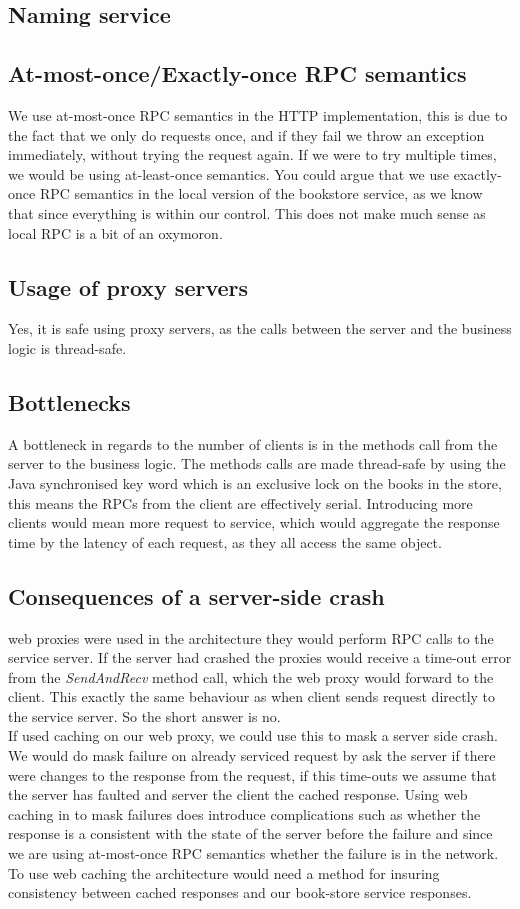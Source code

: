 \documentclass[a4paper]{article}
\begin{document}
\subsection{Naming service}

\subsection{At-most-once/Exactly-once RPC semantics}
We use at-most-once RPC semantics in the HTTP implementation, this is due to the fact that we only do requests once, and if they fail we throw an exception immediately, without trying the request again. If we were to try multiple times, we would be using at-least-once semantics. You could argue that we use exactly-once RPC semantics in the local version of the bookstore service, as we know that since everything is within our control. This does not make much sense as local RPC is a bit of an oxymoron.
\subsection{Usage of proxy servers}
Yes, it is safe using proxy servers, as the calls between the server and the business logic is thread-safe.
\subsection{Bottlenecks}
A bottleneck in regards to the number of clients is in the methods call from the server to the business logic. The methods calls are made thread-safe by using the Java synchronised key word which is an exclusive lock on the books in the store, this means the RPCs from the client are effectively serial. Introducing more clients would mean more request to service, which would aggregate the response time by the latency of each request, as they all access the same object. 
\subsection{Consequences of a server-side crash}
web proxies were used in the architecture they would perform RPC calls to the service server. If the server had crashed the proxies would receive a time-out error from the \textit{SendAndRecv} method call, which the web proxy would forward to the client. This exactly the same behaviour as when client sends request directly to the service server. So the short answer is no.\\
If used caching on our web proxy, we could use this to mask a server side crash. We would do mask failure on already serviced request by ask the server if there were changes to the response from the request, if this time-outs we assume that the server has faulted and server the client the cached response. Using web caching in to mask failures does introduce complications such as whether the response is a consistent with the state of the server before the failure and since we are using at-most-once RPC semantics whether the failure is in the network.\\
To use web caching the architecture would need a method for insuring consistency between cached responses and our book-store service responses.
\end{document}
